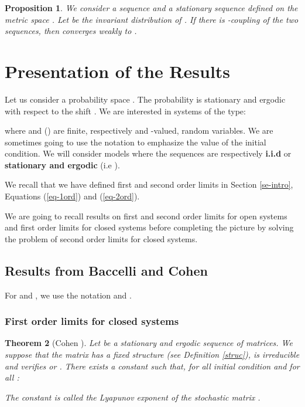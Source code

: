 \documentclass[11pt,titlepage]{article}
\def\eref#1{(\ref{#1})}
\newcommand{\parag}{\medskip\noindent}
\newtheorem{theo}{Theorem }[section]
\newtheorem{prop}[theo]{Proposition }
\begin{document}
\begin{prop} 
We consider a sequence  and a stationary sequence
 defined on the metric space .
Let  be the invariant distribution of . If there is -coupling of the two sequences, then  converges
weakly to .
\label{asmu}
\end{prop}

\section{Presentation of the Results}
\label{se:prr}
Let us consider a probability space . The
probability  is stationary and ergodic with respect to the shift .
We are interested in systems of the type: 

where  and  () are finite, respectively 
and 
-valued, random variables. 
We are sometimes going to use the notation
 to 
emphasize the value of the initial condition. We will
consider models where the sequences  are respectively {\bf
i.i.d}  or
{\bf stationary and ergodic} (i.e ).

\parag

We recall that we have defined first and second order
limits in Section \ref{se-intro}, Equations \eref{eq-1ord} and \eref{eq-2ord}.

We are going to recall results on first and second order limits for open
systems and first order limits for closed systems before
completing the picture by solving the problem of second order limits for
closed systems. 

\subsection{Results from Baccelli \protect\cite{bacc92} and Cohen
\protect\cite{cohe}} 
\label{sse:rfbacc}
For  and , we use
the notation  and . 


\subsubsection{First order limits for closed systems}

\begin{theo}[Cohen \protect\cite{cohe}]
Let  be a stationary and ergodic sequence of 
matrices. We suppose that the matrix  has a fixed structure (see
Definition \ref{struc}), is
irreducible and verifies  or
. 
There exists a constant  such
that, for all initial condition  and for all :

The constant  is called the Lyapunov exponent of the stochastic
matrix . 
\label{first}
\end{theo} 
\end{document}
